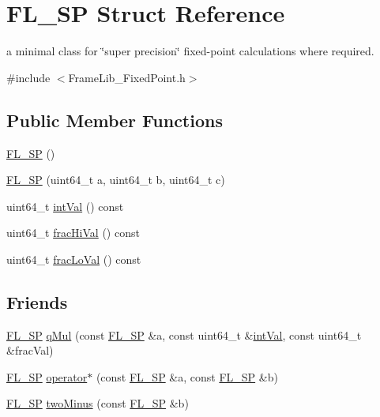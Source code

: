 \hypertarget{struct_f_l___s_p}{}\section{F\+L\+\_\+\+SP Struct Reference}
\label{struct_f_l___s_p}


a minimal class for \char`\"{}super precision\char`\"{} fixed-\/point calculations where required.  




{\ttfamily \#include $<$Frame\+Lib\+\_\+\+Fixed\+Point.\+h$>$}

\subsection*{Public Member Functions}
\begin{DoxyCompactItemize}
\item 
\hyperlink{struct_f_l___s_p_a862ed441d9da9edd82d368ee09686d63}{F\+L\+\_\+\+SP} ()
\item 
\hyperlink{struct_f_l___s_p_ac5e188b9e44e98f6311b6969bb1658be}{F\+L\+\_\+\+SP} (uint64\+\_\+t a, uint64\+\_\+t b, uint64\+\_\+t c)
\item 
uint64\+\_\+t \hyperlink{struct_f_l___s_p_ac515b72596b07a75ab80173537e0358a}{int\+Val} () const
\item 
uint64\+\_\+t \hyperlink{struct_f_l___s_p_a8717bf668103c1de5dfa31cdfabe1b8f}{frac\+Hi\+Val} () const
\item 
uint64\+\_\+t \hyperlink{struct_f_l___s_p_a4121e057fe776544e13014bc15aaceea}{frac\+Lo\+Val} () const
\end{DoxyCompactItemize}
\subsection*{Friends}
\begin{DoxyCompactItemize}
\item 
\hyperlink{struct_f_l___s_p}{F\+L\+\_\+\+SP} \hyperlink{struct_f_l___s_p_a78c2b8a9405fd9e810db0a43bbe03abc}{q\+Mul} (const \hyperlink{struct_f_l___s_p}{F\+L\+\_\+\+SP} \&a, const uint64\+\_\+t \&\hyperlink{struct_f_l___s_p_ac515b72596b07a75ab80173537e0358a}{int\+Val}, const uint64\+\_\+t \&frac\+Val)
\item 
\hyperlink{struct_f_l___s_p}{F\+L\+\_\+\+SP} \hyperlink{struct_f_l___s_p_a871a8c7c5ecf72cb21a348b1e86dd17b}{operator$\ast$} (const \hyperlink{struct_f_l___s_p}{F\+L\+\_\+\+SP} \&a, const \hyperlink{struct_f_l___s_p}{F\+L\+\_\+\+SP} \&b)
\item 
\hyperlink{struct_f_l___s_p}{F\+L\+\_\+\+SP} \hyperlink{struct_f_l___s_p_a2b7132318d02956c6416fef80ad2e29a}{two\+Minus} (const \hyperlink{struct_f_l___s_p}{F\+L\+\_\+\+SP} \&b)
\end{DoxyCompactItemize}


